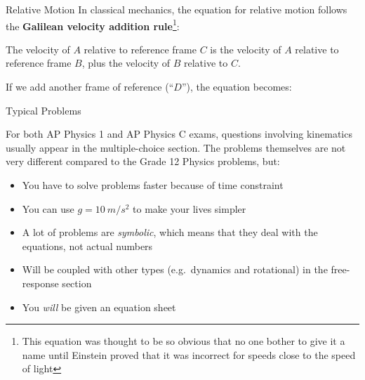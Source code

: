 \documentclass[12pt,compress,aspectratio=169]{beamer}
\newcommand{\mb}[1]{\ensuremath\mathbf{#1}}
\newcommand{\eq}[2]{\vspace{#1}{\Large\begin{displaymath}#2\end{displaymath}}}
\begin{document}
\begin{frame}{Relative Motion}
  In classical mechanics, the equation for relative motion follows the
  \textbf{Galilean velocity addition rule}\footnote{This equation was
    thought to be so obvious that no one bother to give it a name until Einstein
    proved that it was incorrect for speeds close to the speed of light}:

  \eq{-.45in}{
    \boxed{\mb{v}_{AC}=\mb{v}_{AB}+\mb{v}_{BC}}
  }

  \vspace{-.15in}The velocity of $A$ relative to reference frame $C$ is the
  velocity of $A$ relative to reference frame $B$, plus the velocity of $B$
  relative to $C$.

  \vspace{.1in}If we add another frame of reference (``$D$''), the equation
  becomes:

  \eq{-.35in}{
    \mb{v}_{AD}=\mb{v}_{AB}+\mb{v}_{BC}+\mb{v}_{CD}
  }
\end{frame}


\begin{frame}{Typical Problems}

  For both AP Physics 1 and AP Physics C exams, questions involving kinematics
  usually appear in the multiple-choice section. The problems themselves are
  not very different compared to the Grade 12 Physics problems, but:
  \begin{itemize}
  \item You have to solve problems faster because of time constraint
  \item You can use $g=\SI{10}{m/s^2}$ to make your lives simpler
  \item A lot of problems are \emph{symbolic}, which means that they deal with
    the equations, not actual numbers
  \item Will be coupled with other types (e.g.\ dynamics and rotational) in
    the free-response section
  \item You \emph{will} be given an equation sheet
  \end{itemize}
\end{frame}
\end{document}
